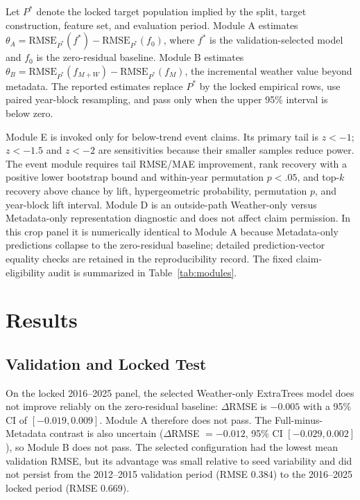 \documentclass[conference]{IEEEtran}
\renewcommand{\arraystretch}{0.98}
\begin{document}
Let $P^\ast$ denote the locked target population implied by the split, target
construction, feature set, and evaluation period. Module A estimates
$\theta_A=\mathrm{RMSE}_{P^\ast}(f^\ast)-\mathrm{RMSE}_{P^\ast}(f_0)$, where
$f^\ast$ is the validation-selected model and $f_0$ is the zero-residual baseline.
Module B estimates
$\theta_B=\mathrm{RMSE}_{P^\ast}(f_{M+W})-\mathrm{RMSE}_{P^\ast}(f_M)$, the
incremental weather value beyond metadata. The reported estimates replace
$P^\ast$ by the locked empirical rows, use paired year-block resampling,
and pass only when the upper 95\% interval is below zero.

Module E is invoked only for below-trend event claims. Its primary tail is $z<-1$;
$z<-1.5$ and $z<-2$ are sensitivities because their smaller samples reduce power.
The event module requires tail RMSE/MAE improvement, rank recovery with a positive
lower bootstrap bound and within-year permutation $p<.05$, and top-$k$ recovery
above chance by lift, hypergeometric probability, permutation $p$, and year-block
lift interval. Module D is an outside-path Weather-only versus Metadata-only
representation diagnostic and does not affect claim permission. In this crop
panel it is numerically identical to Module A because Metadata-only predictions
collapse to the zero-residual baseline; detailed prediction-vector equality
checks are retained in the reproducibility record. The fixed claim-eligibility
audit is summarized in Table~\ref{tab:modules}.

\begin{table}[t]
\centering
\caption{Fixed claim-eligibility modules and locked crop-panel verdicts. Module D
(Weather-only versus Metadata-only) is a descriptive representation diagnostic
outside the permission path and is therefore not a required row. Full
configuration details are in the reproducibility manifest.}
\label{tab:modules}
\footnotesize
\renewcommand{\arraystretch}{1.12}
\resizebox{\textwidth}{!}{}
\end{table}

\section{Results}
\subsection{Validation and Locked Test}
On the locked 2016--2025 panel, the selected Weather-only ExtraTrees model does
not improve reliably on the zero-residual baseline: $\Delta$RMSE is $-0.005$ with
a 95\% CI of $[-0.019,0.009]$. Module A therefore does not pass. The
Full-minus-Metadata contrast is also uncertain ($\Delta$RMSE $=-0.012$, 95\% CI
$[-0.029,0.002]$), so Module B does not pass. The selected configuration had the
lowest mean validation RMSE, but its advantage was small relative to seed
variability and did not persist from the 2012--2015 validation period (RMSE
0.384) to the 2016--2025 locked period (RMSE 0.669).
\end{document}
